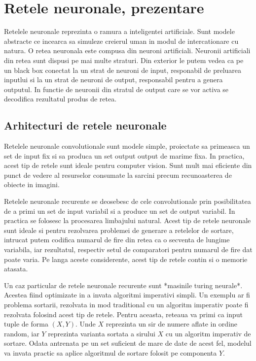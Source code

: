 \documentclass{article}%
\begin{document}
\section{Retele neuronale, prezentare}

Retelele neuronale reprezinta o ramura a inteligentei artificiale. Sunt modele abstracte ce incearca sa simuleze creierul uman
in modul de intercationare cu natura. O retea neuronala este compusa din neuroni artificiali. Neuronii artificiali din retea sunt dispusi pe mai multe straturi. Din exterior le putem vedea ca pe un black box conectat la un strat de neuroni de input, responabil de preluarea inputlui si la un strat de neuroni de output, responsabil pentru a genera outputul. In functie de neuronii din stratul de output care se vor activa se decodifica rezultatul produs de retea.

\subsection{Arhitecturi de retele neuronale}
Retelele neuronale convolutionale sunt modele simple, proiectate sa primeasca un set de input fix si sa produca un set output output de marime fixa. In practica, acest tip de retele sunt ideale pentru computer vision. Sunt mult mai eficiente din punct de vedere al resurselor consumate la sarcini precum recunoasterea de obiecte in imagini. 

Retelele neuronale recurente se deosebesc de cele convolutionale prin posibilitatea de a primi un set de input variabil si a produce un set de output variabil. In practica se folosesc la procesarea limbajului natural. Acest tip de retele neuronale sunt ideale si pentru rezolvarea problemei de generare a retelelor de sortare, intrucat putem codifica numarul de fire din retea ca o secventa de lungime variabila, iar rezultatul, respectiv setul de comparatori pentru numarul de fire dat poate varia. Pe langa aceste considerente, acest tip de retele contin si o memorie atasata.

Un caz particular de retele neuronale recurente sunt *masinile turing neurale*. Acestea fiind optimizate in a invata algoritmi imperativi simpli. Un exemplu ar fi problema sortarii, rezolvata in mod traditional cu un algoritm imperativ poate fi rezolvata folosind acest tip de retele. Pentru aceasta, reteaua va primi ca input tuple de forma $(X, Y)$. Unde $X$ reprezinta un sir de numere aflate in ordine random, iar $Y$ reprezinta varianta sortata a sirului $X$ cu un algoritm imperativ de sortare. Odata antrenata pe un set suficient de mare de date de acest fel, modelul va invata practic sa aplice algoritmul de sortare folosit pe componenta $Y$. 
\end{document}
